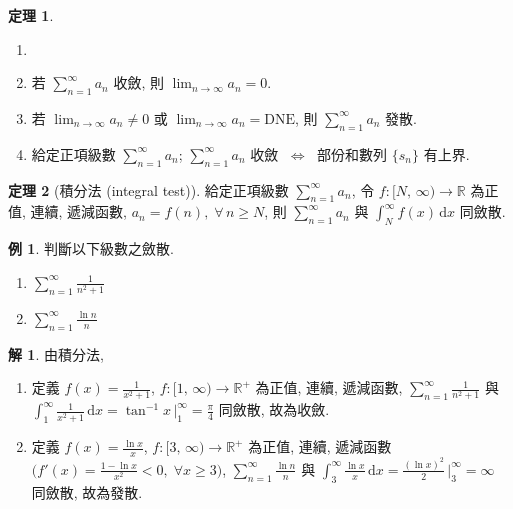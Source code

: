 \documentclass[12pt]{extarticle}
\newcommand{\ds}{\displaystyle}
\newcommand{\ifff}{\;\Longleftrightarrow\;}
\theoremstyle{definition}
\newtheorem*{thm}{定理}
\newtheorem*{ex}{例}
\newtheorem*{sol}{解}
\begin{document}
\begin{thm}
  \begin{enumerate}\setlength{\itemsep}{0pt}
    \item[]
    \item 若 $\ds\sum_{n = 1}^\infty a_n$ 收斂, 則 $\ds\lim_{n\to\infty} a_n = 0$. 
    \item 若 $\ds\lim_{n\to\infty} a_n \ne 0$ 或 $\ds\lim_{n\to\infty} a_n = \text{DNE}$, 則 $\ds\sum_{n = 1}^\infty a_n$ 發散. 
    \item 給定正項級數 $\ds\sum_{n = 1}^\infty a_n$; $\ds\sum_{n = 1}^\infty a_n$ 收斂 $\ifff$ 部份和數列 $\{s_n\}$ 有上界.  
  \end{enumerate}
\end{thm}

\begin{thm}[積分法 (integral test)]
  給定正項級數 $\ds\sum_{n = 1}^\infty a_n$, 令 $\ds f:[N,\,\infty)\to\mathbb{R}$ 為正值, 連續, 遞減函數, $\ds a_n = f(n),\;\forall\,n \geqslant N$, 則 $\ds\sum_{n = 1}^\infty a_n$ 與 $\ds\int_N^\infty f(x)\,\text{d}x$ 同斂散.  
\end{thm}

\begin{ex} 判斷以下級數之斂散. 
  \begin{multicols}{2}
    \begin{enumerate}\setlength{\itemsep}{0pt}
      \item $\ds\sum_{n = 1}^\infty\frac{1}{n^2 + 1}$
      \item $\ds\sum_{n = 1}^\infty\frac{\ln n}{n}$
    \end{enumerate}
  \end{multicols}
\end{ex}

\begin{sol} 由積分法, 
  \begin{enumerate}\setlength{\itemsep}{0pt}
    \item 定義 $\ds f(x) = \frac{1}{x^2 + 1}$, $\ds f:[1,\,\infty)\to\mathbb{R}^+$ 為正值, 連續, 遞減函數, $\ds\sum_{n = 1}^\infty\frac{1}{n^2 + 1}$ 與 $\ds\int_1^\infty\frac{1}{x^2 + 1}\,\text{d}x = \tan^{-1}x\,\big|_1^\infty = \frac{\pi}{4}$ 同斂散, 故為收斂. 
    \item 定義 $\ds f(x) = \frac{\ln x}{x}$, $\ds f:[3,\,\infty)\to\mathbb{R}^+$ 為正值, 連續, 遞減函數 $\ds\bigg(f'(x) = \frac{1 - \ln x}{x^2} < 0, \;\forall x \geqslant 3\bigg)$, $\ds\sum_{n = 1}^\infty\frac{\ln n}{n}$ 與 $\ds\int_3^\infty\frac{\ln x}{x}\,\text{d}x = \frac{(\ln x)^2}{2}\,\bigg|_3^\infty = \infty$ 同斂散, 故為發散. 
  \end{enumerate}
\end{sol}
\end{document}
